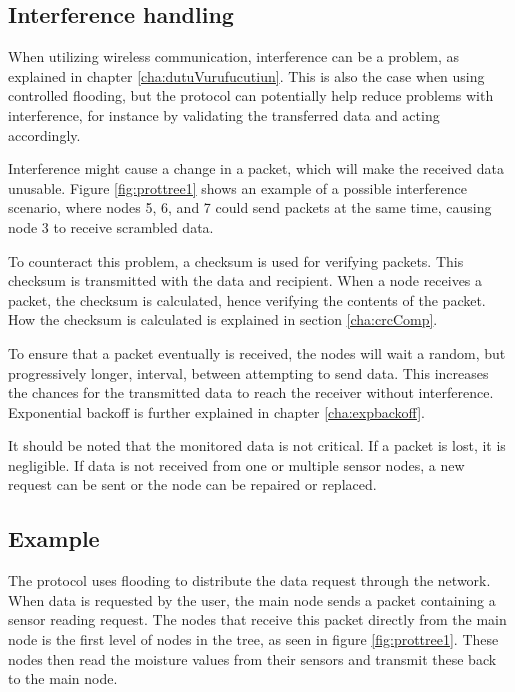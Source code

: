 \subsection{Interference handling} \label{cha:crcDesign}
When utilizing wireless communication, interference can be a problem, as explained in chapter \ref{cha:dutuVurufucutiun}. This is also the case when using controlled flooding, but the protocol can potentially help reduce problems with interference, for instance by validating the transferred data and acting accordingly.

Interference might cause a change in a packet, which will make the received data unusable. Figure \ref{fig:prottree1} shows an example of a possible interference scenario, where nodes 5, 6, and 7 could send packets at the same time, causing node 3 to receive scrambled data.

To counteract this problem, a checksum is used for verifying packets. This checksum is transmitted with the data and recipient. When a node receives a packet, the checksum is calculated, hence verifying the contents of the packet. How the checksum is calculated is explained in section \ref{cha:crcComp}.

To ensure that a packet eventually is received, the nodes will wait a random, but progressively longer, interval, between attempting to send data. This increases the chances for the transmitted data to reach the receiver without interference. Exponential backoff is further explained in chapter \ref{cha:expbackoff}.

It should be noted that the monitored data is not critical. If a packet is lost, it is negligible. If data is not received from one or multiple sensor nodes, a new request can be sent or the node can be repaired or replaced.


\subsection*{Example}
The protocol uses flooding to distribute the data request through the network. 
When data is requested by the user, the main node sends a packet containing a sensor reading request. 
The nodes that receive this packet directly from the main node is the first level of nodes in the tree, as seen in figure \ref{fig:prottree1}. 
These nodes then read the moisture values from their sensors and transmit these back to the main node. 

